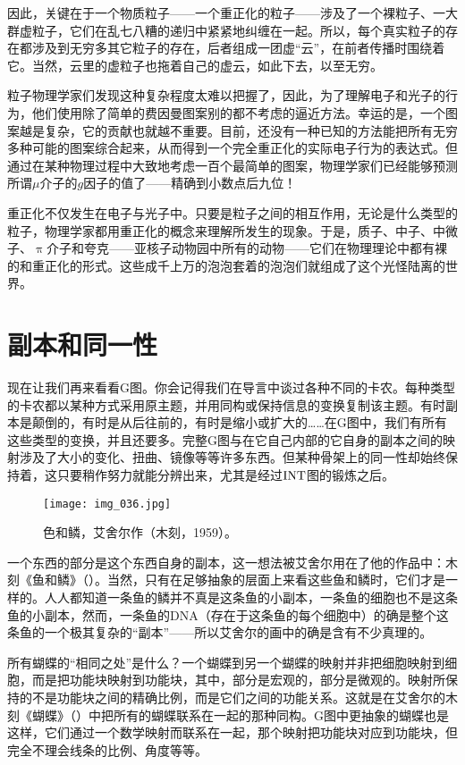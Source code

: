 因此，关键在于一个物质粒子——一个重正化的粒子——涉及了一个裸粒子、一大群虚粒子，它们在乱七八糟的递归中紧紧地纠缠在一起。所以，每个真实粒子的存在都涉及到无穷多其它粒子的存在，后者组成一团虚“云”，在前者传播时围绕着它。当然，云里的虚粒子也拖着自己的虚云，如此下去，以至无穷。

粒子物理学家们发现这种复杂程度太难以把握了，因此，为了理解电子和光子的行为，他们使用除了简单的费因曼图案别的都不考虑的逼近方法。幸运的是，一个图案越是复杂，它的贡献也就越不重要。目前，还没有一种已知的方法能把所有无穷多种可能的图案综合起来，从而得到一个完全重正化的实际电子行为的表达式。但通过在某种物理过程中大致地考虑一百个最简单的图案，物理学家们已经能够预测所谓$\mu$介子的$g$因子的值了——精确到小数点后九位！

重正化不仅发生在电子与光子中。只要是粒子之间的相互作用，无论是什么类型的粒子，物理学家都用重正化的概念来理解所发生的现象。于是，质子、中子、中微子、$\uppi$介子和夸克——亚核子动物园中所有的动物——它们在物理理论中都有裸的和重正化的形式。这些成千上万的泡泡套着的泡泡们就组成了这个光怪陆离的世界。

\section{副本和同一性}

现在让我们再来看看G图。你会记得我们在导言中谈过各种不同的卡农。每种类型的卡农都以某种方式采用原主题，并用同构或保持信息的变换复制该主题。有时副本是颠倒的，有时是从后往前的，有时是缩小或扩大的……在G图中，我们有所有这些类型的变换，并且还要多。完整G图与在它自己内部的它自身的副本之间的映射涉及了大小的变化、扭曲、镜像等等许多东西。但某种骨架上的同一性却始终保持着，这只要稍作努力就能分辨出来，尤其是经过$\operatorname{INT}$图的锻炼之后。

\begin{figure}
\texttt{[image: img\_036.jpg]}
\caption[鱼和鳞，艾舍尔作。]
  {色和鳞，艾舍尔作（木刻，1959）。}
\end{figure}

一个东西的部分是这个东西自身的副本，这一想法被艾舍尔用在了他的作品中：木刻《鱼和鳞》（）。当然，只有在足够抽象的层面上来看这些鱼和鳞时，它们才是一样的。人人都知道一条鱼的鳞并不真是这条鱼的小副本，一条鱼的细胞也不是这条鱼的小副本，然而，一条鱼的DNA（存在于这条鱼的每个细胞中）的确是整个这条鱼的一个极其复杂的“副本”——所以艾舍尔的画中的确是含有不少真理的。

所有蝴蝶的“相同之处”是什么？一个蝴蝶到另一个蝴蝶的映射并非把细胞映射到细胞，而是把功能块映射到功能块，其中，部分是宏观的，部分是微观的。映射所保持的不是功能块之间的精确比例，而是它们之间的功能关系。这就是在艾舍尔的木刻《蝴蝶》（）中把所有的蝴蝶联系在一起的那种同构。G图中更抽象的蝴蝶也是这样，它们通过一个数学映射而联系在一起，那个映射把功能块对应到功能块，但完全不理会线条的比例、角度等等。

